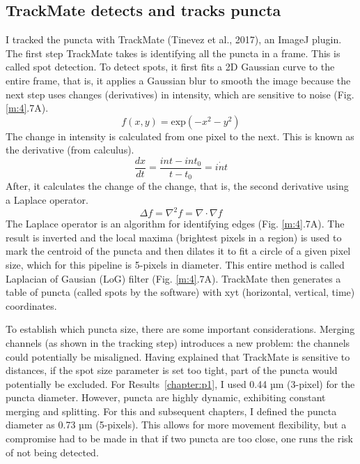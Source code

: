 \subsection{TrackMate detects and tracks puncta}
I tracked the puncta with TrackMate (Tinevez et al., 2017), an ImageJ plugin. The first step TrackMate takes is identifying all the puncta in a frame. This is called spot detection. To detect spots, it first fits a 2D Gaussian curve to the entire frame, that is, it applies a Gaussian blur to smooth the image because the next step uses changes (derivatives) in intensity, which are sensitive to noise (Fig. \ref{m:4}.7A).
\begin{equation}
f(x,y) =\text{exp}(-x^2 - y^2)
\end{equation}
The change in intensity is calculated from one pixel to the next. This is known as the derivative (from calculus). \begin{equation}\frac{dx}{dt} = \frac{int - int_0}{t - t_0} = \dot{int}\end{equation} After, it calculates the change of the change, that is, the second derivative using a Laplace operator. \begin{equation}\Delta f = \nabla^2 f = \nabla \cdot \nabla f\end{equation} The Laplace operator is an algorithm for identifying edges (Fig. \ref{m:4}.7A). The result is inverted and the local maxima (brightest pixels in a region) is used to mark the centroid of the puncta and then dilates it to fit a circle of a given pixel size, which for this pipeline is 5-pixels in diameter. This entire method is called Laplacian of Gausian (LoG) filter (Fig. \ref{m:4}.7A). TrackMate then generates a table of puncta (called spots by the software) with xyt (horizontal, vertical, time) coordinates.

To establish which puncta size, there are some important considerations. Merging channels (as shown in the tracking step) introduces a new problem: the channels could potentially be misaligned. Having explained that TrackMate is sensitive to distances, if the spot size parameter is set too tight, part of the puncta would potentially be excluded. For Results~\ref{chapter:p1}, I used 0.44 µm (3-pixel) for the puncta diameter. However, puncta are highly dynamic, exhibiting constant merging and splitting. For this and subsequent chapters, I defined the puncta diameter as 0.73 µm (5-pixels). This allows for more movement flexibility, but a compromise had to be made in that if two puncta are too close, one runs the risk of not being detected.

